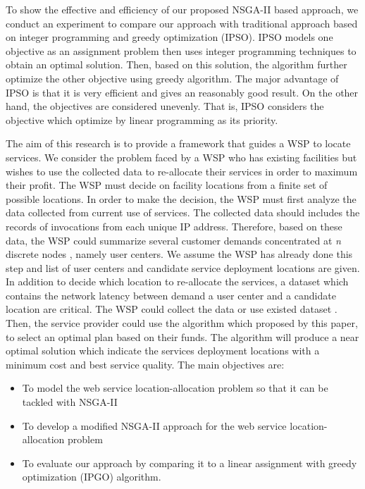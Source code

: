 \documentclass{llncs}
\begin{document}
To show the effective and efficiency of our proposed NSGA-II based approach, we conduct an experiment to compare our approach with
traditional approach based on integer programming and greedy optimization (IPSO). IPSO models one objective as an assignment problem then uses integer programming techniques to 
obtain an optimal solution. Then, based on this solution, the algorithm further optimize the other objective using greedy algorithm. 
The major advantage of IPSO is that it is very efficient and gives 
an reasonably good result. On the other hand, the objectives are considered unevenly. That is, IPSO considers the objective which optimize by linear programming as its priority.


The aim of this research is to provide a framework that guides a WSP to locate services.
We consider the problem faced by a WSP who has existing facilities but wishes to use the collected data to re-allocate their services in order to maximum their profit.
The WSP must decide on facility locations from a finite set of possible locations. 
In order to make the decision, the WSP must first analyze the data collected from current use of services. 
The collected data should includes the records of invocations from each unique IP address.
Therefore, based on these data, the WSP could summarize several customer demands concentrated at \textit{n} discrete nodes \cite{Aboolian}, namely user centers. 
We assume the WSP has already done this step and list of user centers and candidate service deployment locations are given.
In addition to decide which location to re-allocate the services, a dataset which contains the network latency between demand a user center and a candidate location are critical. 
The WSP could collect the data or use existed dataset  \cite{6076756} \cite{5552800}. 
Then, the service provider could use the algorithm which proposed by this paper, to select an optimal plan based on their funds. 
The algorithm will produce a near optimal solution which indicate the services deployment locations with a minimum cost and best service quality.
The main objectives are:
\begin{itemize}
	\item To model the web service location-allocation problem so that it can be tackled with NSGA-II
	\item To develop a modified NSGA-II approach for the web service location-allocation problem
	\item To evaluate our approach by comparing it to a linear assignment with greedy optimization (IPGO) algorithm.
\end{itemize}
\end{document}
